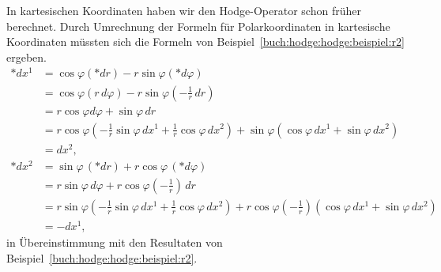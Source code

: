 In kartesischen Koordinaten haben wir den Hodge-Operator schon früher
berechnet.
Durch Umrechnung der Formeln für Polarkoordinaten in kartesische Koordinaten
müssten sich die Formeln von Beispiel~\ref{buch:hodge:hodge:beispiel:r2} ergeben.
\begin{align*}
\ast dx^1
&=
\cos\varphi (\ast dr) - r\sin\varphi(\ast d\varphi)
\\
&=
\cos\varphi (r\,d\varphi) - r\sin\varphi(-{\textstyle\frac1r}\,dr)
\\
&=
r\cos\varphi d\varphi + \sin\varphi\,dr
\\
&=
r\cos\varphi(-{\textstyle\frac1r}\sin\varphi\,dx^1 + {\textstyle\frac1r}\cos\varphi\, dx^2)
+
\sin\varphi(\cos\varphi\,dx^1+\sin\varphi\,dx^2)
\\
&=
dx^2,
\\
\ast dx^2
&=
\sin\varphi\,(\ast dr) + r\cos\varphi\,(\ast d\varphi)
\\
&=
r\sin\varphi\,d\varphi + r\cos\varphi (-{\textstyle\frac1r})\,dr
\\
&=
r\sin\varphi (-{\textstyle\frac1r}\sin\varphi\,dx^1+{\textstyle\frac1r}\cos\varphi\,dx^2)
+
r\cos\varphi(-{\textstyle\frac1r})(\cos\varphi\,dx^1+\sin\varphi\,dx^2)
\\
&=
-dx^1,
\end{align*}
in Übereinstimmung mit den Resultaten von
Beispiel~\ref{buch:hodge:hodge:beispiel:r2}.

%
%
